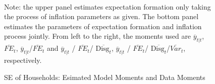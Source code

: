 \documentclass[]{article}
\begin{document}
\begin{figure}[htbp]
\begin{subfigure}[b]{\textwidth}
	\end{subfigure}
	\\
	\begin{flushleft}
		{\footnotesize Note: the upper panel estimates expectation formation only taking the process of inflation parameters as given. The bottom panel estimates the parameters of expectation formation and inflation process jointly. From left to the right, the moments used are $\overline y_{t|t}$, $\overline{FE}_{t}$, $\overline y_{t|t}$/$\overline{FE}_{t}$ and $\overline y_{t|t}$ / $\overline{FE}_{t}$/ $\overline{\textrm{Disg}_t}$, $\overline y_{t|t}$ / $\overline{FE}_{t}$/ $\overline{\textrm{Disg}_t}$/$\overline{Var}_t$,  respectively. }
	\end{flushleft}
	\caption{SE of Households: Esimated Model Moments and Data Moments}
\end{figure}
\end{document}
